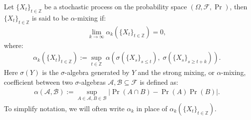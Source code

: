 \begin{definition}\label{def:alpha-mixing}
Let $\{X_t\}_{t\in \mathbb{Z}}$ be a stochastic process on the probability space $(\Omega, \mathcal{F}, \Pr)$, then $\{X_t\}_{t\in \mathbb{Z}}$ is said to be $\alpha$-mixing if:
\begin{align*}
    \lim_{k\to\infty} \alpha_k(\{X_t\}_{t\in\mathbb{Z}}) = 0,
\end{align*}
where:
\begin{align*}
    \alpha_k(\{X_t\}_{t\in\mathbb{Z}}) := \sup_{t\in\mathbb{Z}} \; \alpha\left(\sigma(\{X_s\}_{s \leq t}), \; \sigma(\{X_s\}_{s \geq t + k})\right).
\end{align*}
Here $\sigma(Y)$ is the $\sigma$-algebra generated by $Y$ and the strong mixing, or $\alpha$-mixing, coefficient between two $\sigma$-algebras $\mathcal{A}, \mathcal{B} \subseteq \mathcal{F}$ is defined as:
\begin{align*}
    \alpha(\mathcal{A}, \mathcal{B}) := \sup_{A\in\mathcal{A}, B\in\mathcal{B}} |\Pr(A \cap B) - \Pr(A)\Pr(B)|.
\end{align*}
To simplify notation, we will often write $\alpha_k$ in place of $\alpha_k(\{X_t\}_{t\in\mathbb{Z}})$.
\end{definition}
